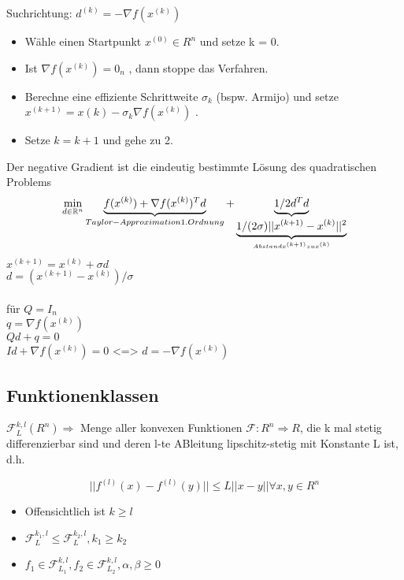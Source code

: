 Suchrichtung: $d^{(k)} = -\nabla f(x^{(k)})$
\begin{itemize}
	\item Wähle einen Startpunkt $x^{(0)} \in R^n$ und setze k = 0.
	\item Ist $\nabla f(x^{(k)}) = 0_n$ , dann stoppe das Verfahren.
	\item Berechne eine effiziente Schrittweite $\sigma_k$ (bspw. Armijo) und setze
	$x^{(k+1)} = x{(k)} - \sigma_k \nabla f(x^{(k)})$ .
	\item Setze $k = k + 1$ und gehe zu 2.
\end{itemize}
Der negative Gradient ist die eindeutig bestimmte Lösung des quadratischen Problems
\begin{equation}
	\min_{d\in\mathbb R^n} \underbrace{f(x^{(k)}) + \nabla f(x^{(k)})^Td}_{Taylor-Approximation 1. Ordnung} + \underbrace{1/2 d^Td}_{\underbrace{1/(2\sigma)||x^{(k+1)} - x^{(k)}||^2}_{Abstand  x^{(k+1)} zu  x^{(k)}}}
\end{equation}
$x^{(k+1)} = x^{(k)} + \sigma d$\\
$d = (x^{(k+1)}-x^{(k)})/\sigma$
\\
\\	
für $Q=I_n$\\
$q = \nabla f(x^{(k)})$\\
$Qd + q = 0$\\
$Id + \nabla f(x^{(k)}) = 0$   <=> $d=-\nabla f(x^{(k)})$

\subsection{Funktionenklassen}	

$\mathcal{F}_L^{k,l} (R^n) \Rightarrow$
Menge aller konvexen Funktionen	$\mathcal{F}:R^n \Rightarrow R$, die k mal stetig differenzierbar sind und deren l-te ABleitung lipschitz-stetig mit Konstante L ist, d.h.

\begin{equation}
||f^{(l)} (x) - f^{(l)} (y)|| \leq L ||x-y|| \forall x,y \in R^n
\end{equation}

\begin{itemize}
	\item Offensichtlich ist $k \geq l$
	\item $\mathcal{F}_L^{k_1,l} \leq \mathcal{F}_L^{k_2,l}, k_1 \geq k_2$
	\item $f_1 \in \mathcal{F}_{L_1}^{k,l}, f_2 \in \mathcal{F}_{L_2}^{k,l}, \alpha, \beta \geq 0$
\end{itemize}

